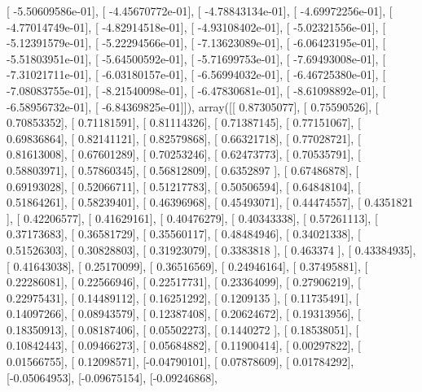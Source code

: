 \documentclass{article}
\begin{document}
       [ -5.50609586e-01],
       [ -4.45670772e-01],
       [ -4.78843134e-01],
       [ -4.69972256e-01],
       [ -4.77014749e-01],
       [ -4.82914518e-01],
       [ -4.93108402e-01],
       [ -5.02321556e-01],
       [ -5.12391579e-01],
       [ -5.22294566e-01],
       [ -7.13623089e-01],
       [ -6.06423195e-01],
       [ -5.51803951e-01],
       [ -5.64500592e-01],
       [ -5.71699753e-01],
       [ -7.69493008e-01],
       [ -7.31021711e-01],
       [ -6.03180157e-01],
       [ -6.56994032e-01],
       [ -6.46725380e-01],
       [ -7.08083755e-01],
       [ -8.21540098e-01],
       [ -6.47830681e-01],
       [ -8.61098892e-01],
       [ -6.58956732e-01],
       [ -6.84369825e-01]]), array([[ 0.87305077],
       [ 0.75590526],
       [ 0.70853352],
       [ 0.71181591],
       [ 0.81114326],
       [ 0.71387145],
       [ 0.77151067],
       [ 0.69836864],
       [ 0.82141121],
       [ 0.82579868],
       [ 0.66321718],
       [ 0.77028721],
       [ 0.81613008],
       [ 0.67601289],
       [ 0.70253246],
       [ 0.62473773],
       [ 0.70535791],
       [ 0.58803971],
       [ 0.57860345],
       [ 0.56812809],
       [ 0.6352897 ],
       [ 0.67486878],
       [ 0.69193028],
       [ 0.52066711],
       [ 0.51217783],
       [ 0.50506594],
       [ 0.64848104],
       [ 0.51864261],
       [ 0.58239401],
       [ 0.46396968],
       [ 0.45493071],
       [ 0.44474557],
       [ 0.4351821 ],
       [ 0.42206577],
       [ 0.41629161],
       [ 0.40476279],
       [ 0.40343338],
       [ 0.57261113],
       [ 0.37173683],
       [ 0.36581729],
       [ 0.35560117],
       [ 0.48484946],
       [ 0.34021338],
       [ 0.51526303],
       [ 0.30828803],
       [ 0.31923079],
       [ 0.3383818 ],
       [ 0.463374  ],
       [ 0.43384935],
       [ 0.41643038],
       [ 0.25170099],
       [ 0.36516569],
       [ 0.24946164],
       [ 0.37495881],
       [ 0.22286081],
       [ 0.22566946],
       [ 0.22517731],
       [ 0.23364099],
       [ 0.27906219],
       [ 0.22975431],
       [ 0.14489112],
       [ 0.16251292],
       [ 0.1209135 ],
       [ 0.11735491],
       [ 0.14097266],
       [ 0.08943579],
       [ 0.12387408],
       [ 0.20624672],
       [ 0.19313956],
       [ 0.18350913],
       [ 0.08187406],
       [ 0.05502273],
       [ 0.1440272 ],
       [ 0.18538051],
       [ 0.10842443],
       [ 0.09466273],
       [ 0.05684882],
       [ 0.11900414],
       [ 0.00297822],
       [ 0.01566755],
       [ 0.12098571],
       [-0.04790101],
       [ 0.07878609],
       [ 0.01784292],
       [-0.05064953],
       [-0.09675154],
       [-0.09246868],
\end{document}
